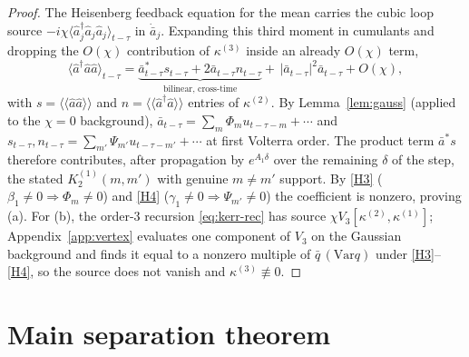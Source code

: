 \documentclass[11pt]{article}
\theoremstyle{remark}
\newcommand{\ahat}{\hat{a}}
\newcommand{\Var}{\mathrm{Var}}
\begin{document}
\begin{proof}
The Heisenberg feedback equation for the mean carries the cubic loop source
$-i\chi\langle \ahat_j^\dagger\ahat_j\ahat_j\rangle_{t-\tau}$ in
$\dot{\bar a}_j$. Expanding this third moment in cumulants and dropping the
$O(\chi)$ contribution of $\kappa^{(3)}$ inside an already $O(\chi)$ term,
\begin{equation}
\langle \ahat^\dagger\ahat\ahat\rangle_{t-\tau}
= \underbrace{\bar a^*_{t-\tau}s_{t-\tau}+2\bar a_{t-\tau}n_{t-\tau}}_{\text{bilinear, cross-time}}
+\,|\bar a_{t-\tau}|^2\bar a_{t-\tau}+O(\chi),
\label{eq:loopsource}
\end{equation}
with $s=\langle\!\langle \ahat\ahat\rangle\!\rangle$ and
$n=\langle\!\langle\ahat^\dagger\ahat\rangle\!\rangle$ entries of $\kappa^{(2)}$.
By Lemma~\ref{lem:gauss} (applied to the $\chi=0$ background),
$\bar a_{t-\tau}=\sum_m\Phi_m u_{t-\tau-m}+\cdots$ and
$s_{t-\tau},n_{t-\tau}=\sum_{m'}\Psi_{m'}u_{t-\tau-m'}+\cdots$ at first Volterra
order. The product term $\bar a^*s$ therefore contributes, after propagation by
$e^{A_1\delta}$ over the remaining $\delta$ of the step, the stated
$K^{(1)}_2(m,m')$ with genuine $m\neq m'$ support. By \ref{H3}
($\beta_1\neq0\Rightarrow\Phi_m\neq0$) and \ref{H4}
($\gamma_1\neq0\Rightarrow\Psi_{m'}\neq0$) the coefficient is nonzero, proving
(a). For (b), the order-3 recursion \eqref{eq:kerr-rec} has source
$\chi V_3[\kappa^{(2)},\kappa^{(1)}]$; Appendix~\ref{app:vertex} evaluates one
component of $V_3$ on the Gaussian background and finds it equal to a nonzero
multiple of $\bar q\,(\Var q)$ under \ref{H3}--\ref{H4}, so the source does not
vanish and $\kappa^{(3)}\not\equiv0$.
\end{proof}

\section{Main separation theorem}
\label{sec:theorem}
\end{document}
